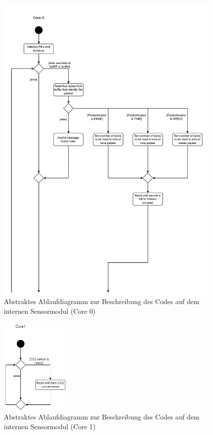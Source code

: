 \documentclass[a4paper,11pt]{article}
\begin{document}
\begin{figure}[H]
  \centering
  \includegraphics[scale=0.75, page=2]{Ablauf intern.pdf}
  \caption{Abstraktes Ablaufdiagramm zur Beschreibung des Codes auf dem internen Sensormodul (Core 0)}
  \label{pdf:ablaufIntern}
\end{figure}

\clearpage
\begin{figure}[H]
  \centering
  \includegraphics[width=0.3\textwidth]{Ablauf intern Core1.png}
  \caption{Abstraktes Ablaufdiagramm zur Beschreibung des Codes auf dem internen Sensormodul (Core 1)}
  \label{pdf:ablaufInternCore1}
\end{figure}
\end{document}
